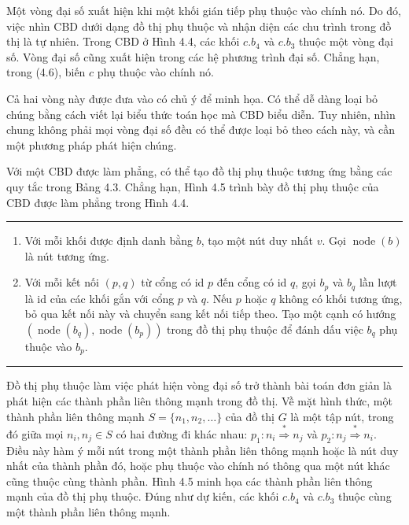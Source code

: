 Một vòng đại số xuất hiện khi một khối gián tiếp phụ thuộc vào chính nó. Do đó, việc nhìn CBD dưới dạng đồ thị phụ thuộc và nhận diện các chu trình trong đồ thị là tự nhiên. Trong CBD ở Hình 4.4, các khối $c.b_4$ và $c.b_3$ thuộc một vòng đại số. Vòng đại số cũng xuất hiện trong các hệ phương trình đại số. Chẳng hạn, trong (4.6), biến $c$ phụ thuộc vào chính nó.

Cả hai vòng này được đưa vào có chủ ý để minh họa. Có thể dễ dàng loại bỏ chúng bằng cách viết lại biểu thức toán học mà CBD biểu diễn. Tuy nhiên, nhìn chung không phải mọi vòng đại số đều có thể được loại bỏ theo cách này, và cần một phương pháp phát hiện chúng.

Với một CBD được làm phẳng, có thể tạo đồ thị phụ thuộc tương ứng bằng các quy tắc trong Bảng 4.3. Chẳng hạn, Hình 4.5 trình bày đồ thị phụ thuộc của CBD được làm phẳng trong Hình 4.4.
\begin{table}[htbp]
\caption{Các quy tắc xây dựng đồ thị phụ thuộc}
\begin{minipage}{\linewidth}\small\hrule\medskip
\begin{enumerate}
\item Với mỗi khối được định danh bằng $b$, tạo một nút duy nhất $v$. Gọi $\operatorname{node}(b)$ là nút tương ứng.
\item Với mỗi kết nối $(p,q)$ từ cổng có id $p$ đến cổng có id $q$, gọi $b_p$ và $b_q$ lần lượt là id của các khối gắn với cổng $p$ và $q$. Nếu $p$ hoặc $q$ không có khối tương ứng, bỏ qua kết nối này và chuyển sang kết nối tiếp theo. Tạo một cạnh có hướng $(\operatorname{node}(b_q),\operatorname{node}(b_p))$ trong đồ thị phụ thuộc để đánh dấu việc $b_q$ phụ thuộc vào $b_p$.
\end{enumerate}\medskip\hrule\end{minipage}
\end{table}

Đồ thị phụ thuộc làm việc phát hiện vòng đại số trở thành bài toán đơn giản là phát hiện các thành phần liên thông mạnh trong đồ thị. Về mặt hình thức, một thành phần liên thông mạnh $S=\{n_1,n_2,\ldots\}$ của đồ thị $G$ là một tập nút, trong đó giữa mọi $n_i,n_j\in S$ có hai đường đi khác nhau: $p_1:n_i\overset{*}{\Rightarrow}n_j$ và $p_2:n_j\overset{*}{\Rightarrow}n_i$. Điều này hàm ý mỗi nút trong một thành phần liên thông mạnh hoặc là nút duy nhất của thành phần đó, hoặc phụ thuộc vào chính nó thông qua một nút khác cũng thuộc cùng thành phần. Hình 4.5 minh họa các thành phần liên thông mạnh của đồ thị phụ thuộc. Đúng như dự kiến, các khối $c.b_4$ và $c.b_3$ thuộc cùng một thành phần liên thông mạnh.

